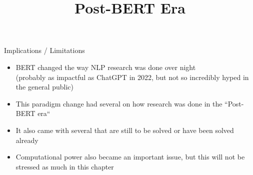 



\newcommand{\titlefigure}{figure/bertology.png}
\newcommand{\learninggoals}{
\item Understand how impactful this architecture was
\item See how this changed research in the field
\item Glimpse into BERTology}

\title{Post-BERT Era}
\date{}




\begin{frame}{Implications / Limitations}

\vfill

	\begin{itemize}
		\item BERT changed the way NLP research was done over night\\
					(probably as impactful as ChatGPT in 2022, but not so incredibly hyped in the general public)
		\item This paradigm change had several  on how research was done in the ``Post-BERT era``
		\item It also came with several  that are still to be solved or have been solved already
		\item Computational power also became an important issue, but this will not be stressed as much in this chapter
	\end{itemize}

\vfill

\end{frame}


